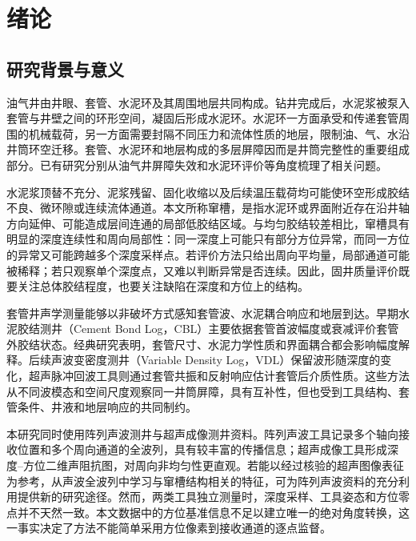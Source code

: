 \chapter{绪\hspace{6pt}论}

\section{研究背景与意义}

油气井由井眼、套管、水泥环及其周围地层共同构成。钻井完成后，水泥浆被泵入套管与井壁之间的环形空间，凝固后形成水泥环。水泥环一方面承受和传递套管周围的机械载荷，另一方面需要封隔不同压力和流体性质的地层，限制油、气、水沿井筒环空迁移。套管、水泥环和地层构成的多层屏障因而是井筒完整性的重要组成部分。已有研究分别从油气井屏障失效和水泥环评价等角度梳理了相关问题\cite{Davies2014WellIntegrity,Udebhulu2023CementIntegrityReview}。

水泥浆顶替不充分、泥浆残留、固化收缩以及后续温压载荷均可能使环空形成胶结不良、微环隙或连续流体通道。本文所称窜槽，是指水泥环或界面附近存在沿井轴方向延伸、可能造成层间连通的局部低胶结区域。与均匀胶结较差相比，窜槽具有明显的深度连续性和周向局部性：同一深度上可能只有部分方位异常，而同一方位的异常又可能跨越多个深度采样点。若评价方法只给出周向平均量，局部通道可能被稀释；若只观察单个深度点，又难以判断异常是否连续。因此，固井质量评价既要关注总体胶结程度，也要关注缺陷在深度和方位上的结构。

套管井声学测量能够以非破坏方式感知套管波、水泥耦合响应和地层到达。早期水泥胶结测井（Cement Bond Log，CBL）主要依据套管首波幅度或衰减评价套管外胶结状态。经典研究表明，套管尺寸、水泥力学性质和界面耦合都会影响幅度解释\cite{Pardue1963CementBond}。后续声波变密度测井（Variable Density Log，VDL）保留波形随深度的变化，超声脉冲回波工具则通过套管共振和反射响应估计套管后介质性质\cite{Froelich1982CementEvaluation,Wang2016AcousticCementMethods}。这些方法从不同波模态和空间尺度观察同一井筒屏障，具有互补性，但也受到工具结构、套管条件、井液和地层响应的共同制约。

本研究同时使用阵列声波测井与超声成像测井资料。阵列声波工具记录多个轴向接收位置和多个周向通道的全波列，具有较丰富的传播信息；超声成像工具形成深度--方位二维声阻抗图，对周向非均匀性更直观。若能以经过核验的超声图像表征为参考，从声波全波列中学习与窜槽结构相关的特征，可为阵列声波资料的充分利用提供新的研究途径。然而，两类工具独立测量时，深度采样、工具姿态和方位零点并不天然一致。本文数据中的方位基准信息不足以建立唯一的绝对角度转换，这一事实决定了方法不能简单采用方位像素到接收通道的逐点监督。

